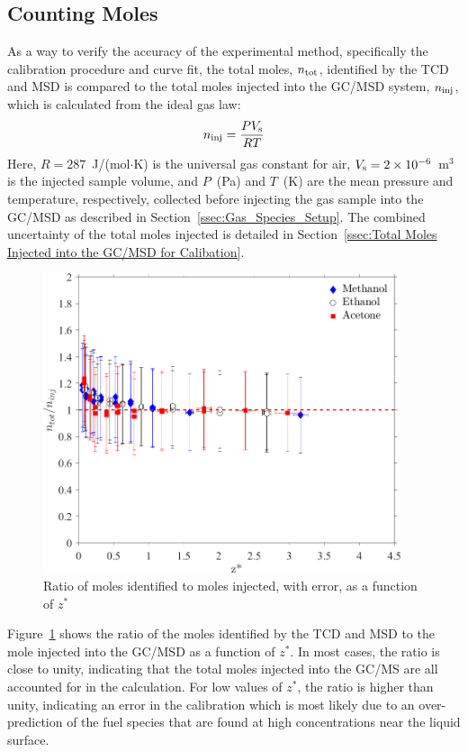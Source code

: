 \documentclass[12pt]{article}
\begin{document}
\subsection{Counting Moles}

As a way to verify the accuracy of the experimental method, specifically the calibration procedure and curve fit, the total moles, $n_{\rm tot}$, identified by the TCD and MSD is compared to the total moles injected into the GC/MSD system, $n_{\rm inj}$, which is calculated from the ideal gas law:
\begin{equation}\label{eq:moles_inj}
n_{\rm inj}=\frac{PV_{\rm s}}{RT}
\end{equation}
Here, $R=287$~J/(mol$\cdot$K) is the universal gas constant for air, $V_{\rm s}=2\times 10^{-6}$~m$^3$ is the injected sample volume, and $P$~(Pa) and $T$~(K) are the mean pressure and temperature, respectively, collected before injecting the gas sample into the GC/MSD as described in Section~\ref{ssec:Gas_Species_Setup}. The combined uncertainty of the total moles injected is detailed in Section~\ref{ssec:Total Moles Injected into the GC/MSD for Calibation}.

\begin{figure}[h!]
	\centering
\includegraphics[width=10.5cm,keepaspectratio]{mole_ratio_Comparison.png}
	\caption[Ratio of moles identified to moles injected]{Ratio of moles identified to moles injected, with error, as a function of $z^*$}
	\label{fig:Mole_Comp}
\end{figure}

Figure~\ref{fig:Mole_Comp} shows the ratio of the moles identified by the TCD and MSD to the mole injected into the GC/MSD as a function of $z^*$. In most cases, the ratio is close to unity, indicating that the total moles injected into the GC/MS are all accounted for in the calculation. For low values of $z^*$, the ratio is higher than unity, indicating an error in the calibration which is most likely due to an over-prediction of the fuel species that are found at high concentrations near the liquid surface.
\end{document}
